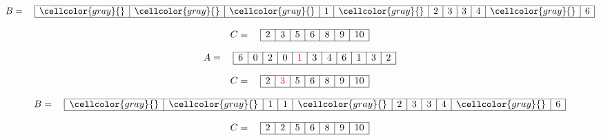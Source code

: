\documentclass{article}
\begin{document}
\[
B = \quad
\begin{array}{|c|c|c|c|c|c|c|c|c|c|c|}
\hline
\cellcolor{gray}{} & \cellcolor{gray}{} & \cellcolor{gray}{} & 
1 & \cellcolor{gray}{} & 2 & 
3 & 3 & 4 & 
\cellcolor{gray}{} & 6 \\ 
\hline
\end{array}
\]

\[
C = \quad
\begin{array}{|c|c|c|c|c|c|c|}
\hline
2 & 3 & 5 & 6 & 8 & 9 & 10 \\ 
\hline
\end{array}
\]


\begin{center}
\end{center}

\[
A = \quad
\begin{array}{|c|c|c|c|c|c|c|c|c|c|c|}
\hline
6 & 0 & 2 & 0 & \textcolor{red}{1} & 3 & 4 & 6 & 1 & 3 & 2 \\ 
\hline
\end{array}
\]

\[
C = \quad
\begin{array}{|c|c|c|c|c|c|c|}
\hline
2 & \textcolor{red}{3} & 5 & 6 & 8 & 9 & 10 \\ 
\hline
\end{array}
\]

\[
B = \quad
\begin{array}{|c|c|c|c|c|c|c|c|c|c|c|}
\hline
\cellcolor{gray}{} & \cellcolor{gray}{} & 1 & 
1 & \cellcolor{gray}{} & 2 & 
3 & 3 & 4 & 
\cellcolor{gray}{} & 6 \\ 
\hline
\end{array}
\]

\[
C = \quad
\begin{array}{|c|c|c|c|c|c|c|}
\hline
2 & 2 & 5 & 6 & 8 & 9 & 10 \\ 
\hline
\end{array}
\]

\begin{center}
\end{center}
\end{document}
